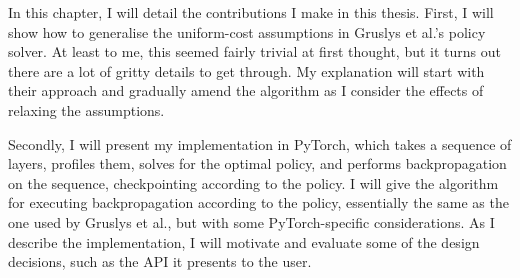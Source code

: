 In this chapter, I will detail the contributions I make in this thesis.
First, I will show how to generalise the uniform-cost assumptions in Gruslys et al.'s policy solver.
At least to me, this seemed fairly trivial at first thought, but it turns out there are a lot of gritty details to get through.
My explanation will start with their approach and gradually amend the algorithm as I consider the effects of relaxing the assumptions.

Secondly, I will present my implementation in PyTorch, which takes a sequence of layers, profiles them, solves for the optimal policy, and performs backpropagation on the sequence, checkpointing according to the policy.
I will give the algorithm for executing backpropagation according to the policy, essentially the same as the one used by Gruslys et al., but with some PyTorch-specific considerations.
As I describe the implementation, I will motivate and evaluate some of the design decisions, such as the API it presents to the user.
